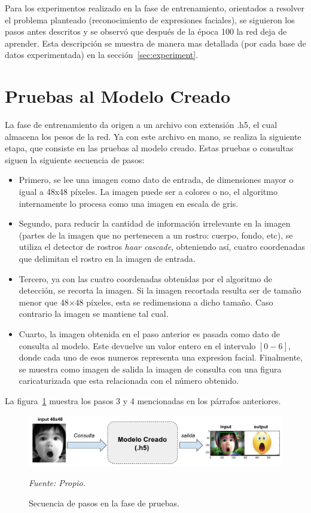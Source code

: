 Para los experimentos realizado en la fase de entrenamiento, orientados a resolver el problema planteado (reconocimiento de expresiones faciales), se siguieron los pasos antes descritos y se observó que después de la época 100 la red deja de aprender. Esta descripción se muestra de manera mas detallada (por cada base de datos experimentada) en la sección~\ref{sec:experiment}.

\section{Pruebas al Modelo Creado}

La fase de entrenamiento da origen a un archivo con extensión .h5, el cual almacena los pesos de la red. Ya con este archivo en mano, se realiza la siguiente etapa, que consiste en las pruebas al modelo creado. Estas pruebas o consultas siguen la siguiente secuencia de pasos: 

\begin{itemize}
\item Primero, se lee una imagen como dato de entrada, de dimensiones mayor o igual a 48x48 píxeles. La imagen puede ser a colores o no, el algoritmo internamente lo procesa como una imagen en escala de gris.
\item Segundo, para reducir la cantidad de información irrelevante en la imagen (partes de la imagen que no pertenecen a un rostro: cuerpo, fondo, etc), se utiliza el detector de rostros \textit{haar cascade}, obteniendo así, cuatro coordenadas que delimitan el rostro en la imagen de entrada.
\item Tercero, ya con las cuatro coordenadas obtenidas por el algoritmo de detección, se recorta la imagen. Si la imagen recortada resulta ser de tamaño menor que 48$\times$48 píxeles, esta se redimensiona a dicho tamaño. Caso contrario la imagen se mantiene tal cual.
\item Cuarto, la imagen obtenida en el paso anterior es pasada como dato de consulta al modelo. Este devuelve un valor entero en el intervalo $[0-6]$, donde cada uno de esos numeros representa una expresion facial. Finalmente, se muestra como imagen de salida la imagen de consulta con una figura caricaturizada que esta relacionada con el número obtenido.
\end{itemize}

La figura~\ref{fig:test} muestra los pasos 3 y 4 mencionadas en los párrafos anteriores.

\begin{figure}[H]
		\centering
		\includegraphics[width=160mm]{Imagenes/test.pdf}
		\caption{Secuencia de pasos en la fase de pruebas.}
		\vspace{0.15cm}
		\textit{Fuente: Propio.}
		\label{fig:test}
\end{figure}

